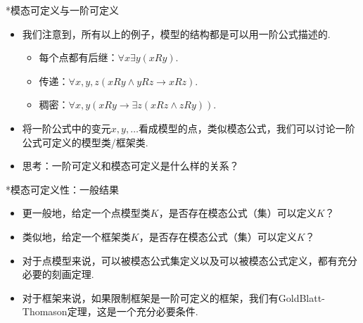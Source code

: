     \begin{frame}{*模态可定义与一阶可定义}
    \begin{itemize}
        \item 我们注意到，所有以上的例子，模型的结构都是可以用一阶公式描述的.
        \begin{itemize}
            \item 每个点都有后继：$\forall x\exists y(xRy)$.
            \item 传递：$\forall x,y,z(xRy\wedge yRz\to xRz)$.
            \item 稠密：$\forall x,y(xRy\to\exists z(xRz\wedge zRy))$.
        \end{itemize}
        \item 将一阶公式中的变元$x,y,\dots$看成模型的点，类似模态公式，我们可以讨论一阶公式可定义的模型类/框架类.
        \item 思考：一阶可定义和模态可定义是什么样的关系？
    \end{itemize}
    \end{frame}
    
    \begin{frame}{*模态可定义性：一般结果}
    \begin{itemize}
        \item 更一般地，给定一个点模型类$K$，是否存在模态公式（集）可以定义$K$？
        \item 类似地，给定一个框架类$K$，是否存在模态公式（集）可以定义$K$？
        \item 对于点模型来说，可以被模态公式集定义以及可以被模态公式定义，都有充分必要的刻画定理.
        \item 对于框架来说，如果限制框架是一阶可定义的框架，我们有GoldBlatt-Thomason定理，这是一个充分必要条件.
    \end{itemize}
    \end{frame}
    